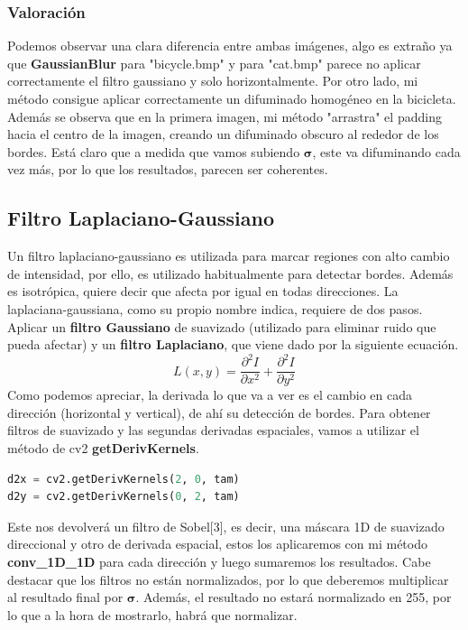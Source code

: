 \documentclass{article}
\begin{document}
\newpage

\subsubsection{Valoración}
Podemos observar una clara diferencia entre ambas imágenes, algo es extraño ya que \textbf{GaussianBlur} para "bicycle.bmp" y para "cat.bmp" parece no aplicar correctamente el filtro gaussiano y solo horizontalmente. Por otro lado, mi método consigue aplicar correctamente un difuminado homogéneo en la bicicleta. Además se observa que en la primera imagen, mi método "arrastra" el padding hacia el centro de la imagen, creando un difuminado obscuro al rededor de los bordes. Está claro que a medida que vamos subiendo $\boldsymbol{\sigma}$, este va difuminando cada vez más, por lo que los resultados, parecen ser coherentes.

\subsection{Filtro Laplaciano-Gaussiano}
Un filtro laplaciano-gaussiano es utilizada para marcar regiones con alto cambio de intensidad, por ello, es utilizado habitualmente para detectar bordes. Además es isotrópica, quiere decir que afecta por igual en todas direcciones.
\newline
\newline
La laplaciana-gaussiana, como su propio nombre indica, requiere de dos pasos. Aplicar un \textbf{filtro Gaussiano} de suavizado (utilizado para eliminar ruido que pueda afectar) y un \textbf{filtro Laplaciano}, que viene dado por la siguiente ecuación.
$$ L(x, y) = \dfrac{\partial^2I}{\partial x^2} + \dfrac{\partial^2I}{\partial y^2}$$
Como podemos apreciar, la derivada lo que va a ver es el cambio en cada dirección (horizontal y vertical), de ahí su detección de bordes.
\newline
\newline
Para obtener filtros de suavizado y las segundas derivadas espaciales, vamos a utilizar el método de cv2 \textbf{getDerivKernels}.
\begin{lstlisting}[language=Python]
d2x = cv2.getDerivKernels(2, 0, tam)
d2y = cv2.getDerivKernels(0, 2, tam)
\end{lstlisting}
Este nos devolverá un filtro de Sobel[3], es decir, una máscara 1D de suavizado direccional y otro de derivada espacial, estos los aplicaremos con mi método \textbf{conv\_1D\_1D} para cada dirección y luego sumaremos los resultados.
\newline
\newline
Cabe destacar que los filtros no están normalizados, por lo que deberemos multiplicar al resultado final por $\boldsymbol{\sigma}$. Además, el resultado no estará normalizado en 255, por lo que a la hora de mostrarlo, habrá que normalizar.
\end{document}
